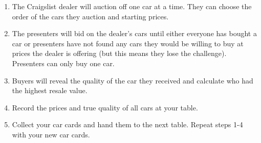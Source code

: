 \documentclass{article}
\begin{document}
\begin{enumerate}
  \item The Craigslist dealer will auction off one car at a time.
  They can choose the order of the cars they auction and starting prices.

  \item The presenters will bid on the dealer's cars until either everyone has bought a car 
  or presenters have not found any cars they would be willing to buy 
  at prices the dealer is offering
  (but this means they lose the challenge).
  Presenters can only buy one car.

  \item Buyers will reveal the quality of the car they received
  and calculate who had the highest resale value.

  \item Record the prices and true quality of all cars at your table.

  \item Collect your car cards and hand them to the next table.
  Repeat steps 1-4 with your new car cards.
\end{enumerate}
\end{document}
